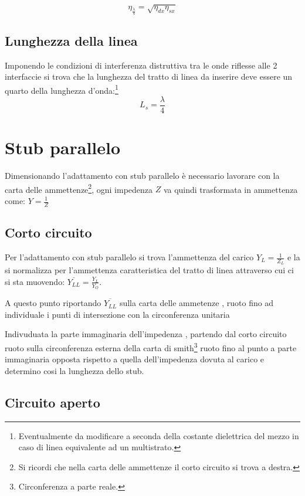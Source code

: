 \documentclass[10pt,a4paper]{report}
\begin{document}
				\begin{equation}
				\eta_{\frac{\lambda}{4}}=\sqrt{\eta_{dx}\eta_{sx}}
				\end{equation}

		\subsection{Lunghezza della linea}
				Imponendo le condizioni di interferenza distruttiva tra le onde riflesse alle 2 interfaccie si trova che la lunghezza del tratto di linea da inserire deve essere un quarto della lunghezza d'onda:\footnote{Eventualmente da modificare a seconda della costante dielettrica del mezzo in caso di linea equivalente ad un multistrato.}
				\begin{equation}
				L_s= \frac {\lambda} {4}
				\end{equation}

	\section{Stub parallelo}

		Dimensionando l'adattamento con stub parallelo è necessario lavorare con la carta delle ammettenze\footnote{Si ricordi che nella carta delle ammettenze il corto circuito si trova a destra.}, ogni impedenza $Z$ va quindi trasformata in ammettenza come: $Y=\frac{1}{Z}$

		\subsection{Corto circuito}
				
			Per l'adattamento con stub parallelo si trova l'ammettenza del carico $Y_L=\frac{1}{Z_L}$ e la si normalizza per l'ammettenza caratteristica del tratto di linea attraverso cui ci si sta muovendo: $\overline{Y_{LL}}=\frac{Y_L}{Y_O}$.


			A questo punto riportando $\overline{Y_{LL}}$ sulla carta delle ammetenze , ruoto fino ad individuale i punti di intersezione con la circonferenza unitaria

			Indivuduata la parte immaginaria dell'impedenza , partendo dal corto circuito ruoto sulla circonferenza esterna della carta di smith\footnote{Circonferenza a parte reale.} ruoto fino al punto a parte immaginaria opposta rispetto a quella dell'impedenza dovuta al carico e determino cosi la lunghezza dello stub.

		\subsection{Circuito aperto}
\end{document}

